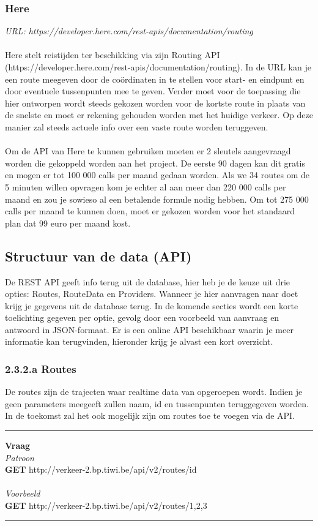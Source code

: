 \documentclass[ps,a4paper,oneside]{report}
\begin{document}
\subsubsection{Here}
\textit{URL: https://developer.here.com/rest-apis/documentation/routing}\\\\
Here stelt reistijden ter beschikking via zijn Routing API \\(https://developer.here.com/rest-apis/documentation/routing). In de URL kan je een route meegeven door de co\"ordinaten in te stellen voor start- en eindpunt en door eventuele tussenpunten mee te geven. Verder moet voor de toepassing die hier ontworpen wordt steeds gekozen worden voor de kortste route in plaats van de snelste en moet er rekening gehouden worden met het huidige verkeer. Op deze manier zal steeds actuele info over een vaste route worden teruggeven.\\\\
Om de API van Here te kunnen gebruiken moeten er 2 sleutels aangevraagd worden die gekoppeld worden aan het project. De eerste 90 dagen kan dit gratis en mogen er tot 100 000 calls per maand gedaan worden. Als we 34 routes om de 5 minuten willen opvragen kom je echter al aan meer dan 220 000 calls per maand en zou je sowieso al een betalende formule nodig hebben. Om tot 275 000 calls per maand te kunnen doen, moet er gekozen worden voor het standaard plan dat 99 euro per maand kost.
\subsection{Structuur van de data (API)}
De REST API geeft info terug uit de database, hier heb je de keuze uit drie opties: Routes, RouteData en Providers. Wanneer je hier aanvragen naar doet krijg je gegevens uit de database terug. In de komende secties wordt een korte toelichting gegeven per optie, gevolg door een voorbeeld van aanvraag en antwoord in JSON-formaat. Er is een online API beschikbaar waarin je meer informatie kan terugvinden, hieronder krijg je alvast een kort overzicht.

\subsubsection{2.3.2.a Routes}
De routes zijn de trajecten waar realtime data van opgeroepen wordt. Indien je geen parameters meegeeft zullen naam, id en tussenpunten teruggegeven worden. In de toekomst zal het ook mogelijk zijn om routes toe te voegen via de API.
\clearpage
\noindent\rule[0.5ex]{\linewidth}{1pt}
\textbf{Vraag}\\
\textit{Patroon}\\
\textbf{GET} http://verkeer-2.bp.tiwi.be/api/v2/routes/id\\\\
\textit{Voorbeeld}\\
\textbf{GET} http://verkeer-2.bp.tiwi.be/api/v2/routes/1,2,3\\
\noindent\rule[0.5ex]{\linewidth}{1pt}
\end{document}
